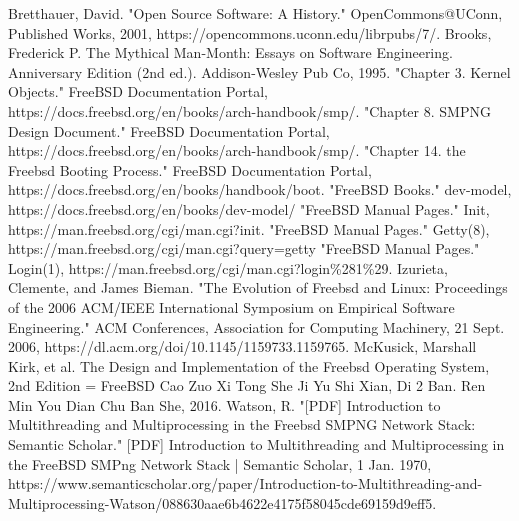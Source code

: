 \documentclass[12pt, dvipsnames, a4paper]{article}
\begin{document}
\begin{thebibliography}{00}
	Bretthauer, David. "Open Source Software: A History." OpenCommons@UConn, Published Works, 2001, https://opencommons.uconn.edu/librpubs/7/.
	 Brooks, Frederick P. The Mythical Man-Month: Essays on Software Engineering. Anniversary Edition (2nd ed.). Addison-Wesley Pub Co, 1995.
	 "Chapter 3. Kernel Objects." FreeBSD Documentation Portal, https://docs.freebsd.org/en/books/arch-handbook/smp/.
	 "Chapter 8. SMPNG Design Document." FreeBSD Documentation Portal, https://docs.freebsd.org/en/books/arch-handbook/smp/.
	 "Chapter 14. the Freebsd Booting Process." FreeBSD Documentation Portal, https://docs.freebsd.org/en/books/handbook/boot.
	 "FreeBSD Books." dev-model, https://docs.freebsd.org/en/books/dev-model/
	 "FreeBSD Manual Pages." Init, https://man.freebsd.org/cgi/man.cgi?init.
	 "FreeBSD Manual Pages." Getty(8), https://man.freebsd.org/cgi/man.cgi?query=getty
	 "FreeBSD Manual Pages." Login(1), https://man.freebsd.org/cgi/man.cgi?login\%281\%29.
	Izurieta, Clemente, and James Bieman. "The Evolution of Freebsd and Linux: Proceedings of the 2006 ACM/IEEE International Symposium on Empirical Software Engineering." ACM Conferences, Association for Computing Machinery, 21 Sept. 2006, https://dl.acm.org/doi/10.1145/1159733.1159765.
	 McKusick, Marshall Kirk, et al. The Design and Implementation of the Freebsd Operating System, 2nd Edition = FreeBSD Cao Zuo Xi Tong She Ji Yu Shi Xian, Di 2 Ban. Ren Min You Dian Chu Ban She, 2016.
	 Watson, R. "[PDF] Introduction to Multithreading and Multiprocessing in the Freebsd SMPNG Network Stack: Semantic Scholar." [PDF]  Introduction to Multithreading and Multiprocessing in the FreeBSD SMPng Network Stack | Semantic Scholar, 1 Jan. 1970, https://www.semanticscholar.org/paper/Introduction-to-Multithreading-and-Multiprocessing-Watson/088630aae6b4622e4175f58045cde69159d9eff5.
\end{thebibliography}
\end{document}
